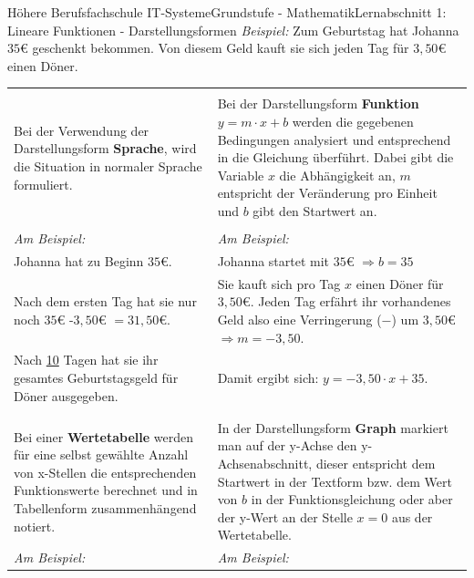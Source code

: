 \documentclass[oneside,openany,headings=optiontotoc,11pt,numbers=noenddot]{scrreprt}
\begin{document}
	\begin{worksheet}{Höhere Berufsfachschule IT-Systeme}{Grundstufe - Mathematik}{Lernabschnitt 1: Lineare Funktionen - Darstellungsformen}
		\noindent
		\textit{Beispiel:} Zum Geburtstag hat Johanna \(35\)\euro{} geschenkt bekommen. Von diesem Geld kauft sie sich jeden Tag für \(3,50\)\euro{} einen Döner.
		\begin{framed}
			\noindent
			\begin{tabularx}{\textwidth}{X|X}
				\small{\color{codegray}{Sprache}} & \small{\color{codegray}{Funktion}}\\
				\normalsize
				Bei der Verwendung der Darstellungsform \textbf{Sprache}, wird die Situation in normaler Sprache formuliert. & Bei der Darstellungsform \textbf{Funktion} \(y = m\cdot{}x+b\) werden die gegebenen Bedingungen analysiert und entsprechend in die Gleichung überführt. Dabei gibt die Variable \(x\) die Abhängigkeit an, \(m\) entspricht der Veränderung pro Einheit und \(b\) gibt den Startwert an.\\
				& \\
				\textit{Am Beispiel:} & \textit{Am Beispiel:}\\
				Johanna hat zu Beginn \(35\)\euro{}. & Johanna startet mit \(35\)\euro{} \(\Rightarrow b = 35\)\\
				 Nach dem ersten Tag hat sie nur noch \(35\)\euro{} -\(3,50\)\euro{} \(= 31,50\)\euro{}. & Sie kauft sich pro Tag \(x\) einen Döner für \(3,50\)\euro{}. Jeden Tag erfährt ihr vorhandenes Geld also eine Verringerung (\(-\)) um \(3,50\)\euro{} \(\Rightarrow m = -3,50\).\\
				Nach \underline{10} Tagen hat sie ihr gesamtes Geburtstagsgeld für Döner ausgegeben. & Damit ergibt sich: \(y = -3,50\cdot{}x + 35\).\\
				\\
				\hline
				\small{\color{codegray}{Wertetabelle}} &\small{\color{codegray}{Graph}}\\
				Bei einer \textbf{Wertetabelle} werden für eine selbst gewählte Anzahl von x-Stellen die entsprechenden Funktionswerte berechnet und in Tabellenform zusammenhängend notiert. & In der Darstellungsform \textbf{Graph} markiert man auf der y-Achse den y-Achsenabschnitt, dieser entspricht dem Startwert in der Textform bzw. dem Wert von \(b\) in der Funktionsgleichung oder aber der y-Wert an der Stelle \(x=0\) aus der Wertetabelle.\\
				\textit{Am Beispiel:} & \textit{Am Beispiel:}\\

\end{tabularx}
\end{framed}
\end{worksheet}
\end{document}
